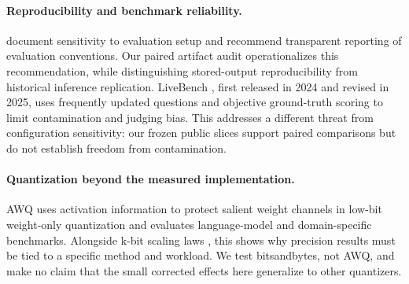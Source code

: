 \paragraph{Reproducibility and benchmark reliability.}
\citet{biderman2024lessons} document sensitivity to evaluation setup and
recommend transparent reporting of evaluation conventions. Our paired
artifact audit operationalizes this recommendation, while distinguishing
stored-output reproducibility from historical inference replication.
LiveBench \citep{white2024livebench}, first released in 2024 and revised in
2025, uses frequently updated questions and objective ground-truth scoring
to limit contamination and judging bias. This addresses a different threat
from configuration sensitivity: our frozen public slices support paired
comparisons but do not establish freedom from contamination.

\paragraph{Quantization beyond the measured implementation.}
AWQ \citep{lin2023awq} uses activation information to protect salient weight
channels in low-bit weight-only quantization and evaluates language-model
and domain-specific benchmarks. Alongside k-bit scaling laws
\citep{dettmers2023case}, this shows why precision results must be tied to a
specific method and workload. We test bitsandbytes, not AWQ, and make no
claim that the small corrected effects here generalize to other quantizers.
